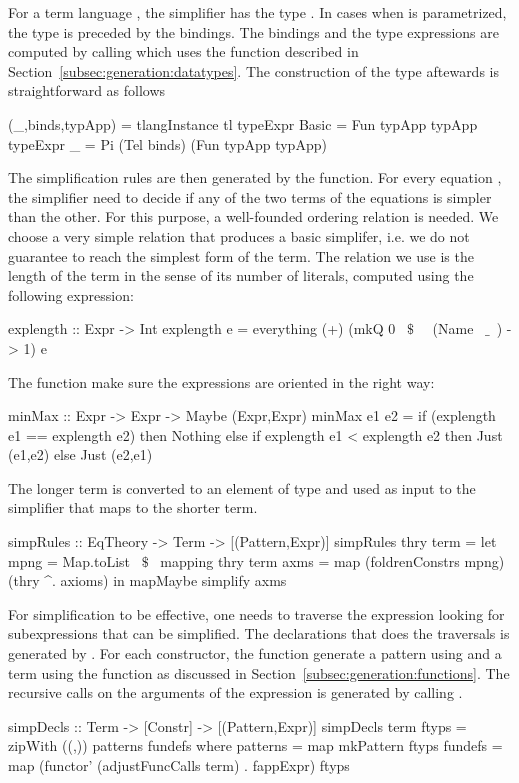 For a term language , the simplifier has the type . In cases when  is parametrized, the type is preceded by the bindings. The bindings and the type expressions are computed by calling  which uses the  function described in Section~\ref{subsec:generation:datatypes}. The construction of the type aftewards is straightforward as follows 
\begin{hscode} 
 (_,binds,typApp) = tlangInstance tl
 typeExpr Basic = Fun typApp typApp
 typeExpr _     = Pi (Tel binds) (Fun typApp typApp)
\end{hscode} 

The simplification rules are then generated by the  function. For every equation , the simplifier need to decide if any of the two terms of the equations is simpler than the other. For this purpose, a well-founded ordering relation is needed. We choose a very simple relation that produces a basic simplifer, i.e. we do not guarantee to reach the simplest form of the term. The relation we use is the length of the term in the sense of its number of literals, computed using the following expression: 
\begin{hscode} 
explength :: Expr -> Int
explength e = everything (+) (mkQ 0 ~$\$$~ \ (Name ~$\_$~) -> 1) e
\end{hscode} 
The function  make sure the expressions are oriented in the right way: 
\begin{hscode}
minMax :: Expr -> Expr -> Maybe (Expr,Expr)
minMax e1 e2 =
  if (explength e1 == explength e2) then Nothing
  else if explength e1 < explength e2 then Just (e1,e2)
  else Just (e2,e1) 
\end{hscode} 
The longer term is converted to an element of type  and used as input to the simplifier that maps to the shorter term.  
\begin{hscode} 
simpRules :: EqTheory -> Term -> [(Pattern,Expr)]
simpRules thry term =
 let mpng = Map.toList ~$\$$~ mapping thry term
     axms = map (foldrenConstrs mpng) (thry ^. axioms) 
 in mapMaybe simplify axms
\end{hscode} 

For simplification to be effective, one needs to traverse the expression looking for subexpressions that can be simplified. The declarations that does the traversals is generated by . For each constructor, the function generate a pattern using  and a term using the  function as discussed in Section~\ref{subsec:generation:functions}. The recursive calls on the arguments of the expression is generated by calling . 
\begin{hscode}
simpDecls :: Term -> [Constr] -> [(Pattern,Expr)]
simpDecls term ftyps =
   zipWith ((,)) patterns fundefs
   where patterns = map mkPattern ftyps
         fundefs = map (functor' (adjustFuncCalls term) . fappExpr) ftyps
\end{hscode}

